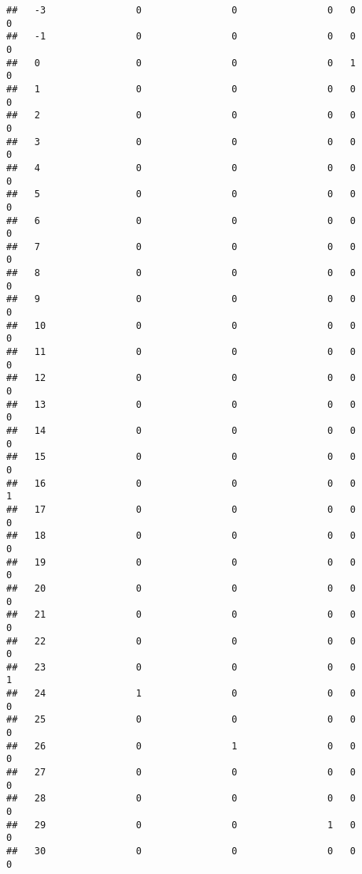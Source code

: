 \documentclass[]{article}
\begin{document}
\begin{verbatim}
##   -3                0                0                0   0                0
##   -1                0                0                0   0                0
##   0                 0                0                0   1                0
##   1                 0                0                0   0                0
##   2                 0                0                0   0                0
##   3                 0                0                0   0                0
##   4                 0                0                0   0                0
##   5                 0                0                0   0                0
##   6                 0                0                0   0                0
##   7                 0                0                0   0                0
##   8                 0                0                0   0                0
##   9                 0                0                0   0                0
##   10                0                0                0   0                0
##   11                0                0                0   0                0
##   12                0                0                0   0                0
##   13                0                0                0   0                0
##   14                0                0                0   0                0
##   15                0                0                0   0                0
##   16                0                0                0   0                1
##   17                0                0                0   0                0
##   18                0                0                0   0                0
##   19                0                0                0   0                0
##   20                0                0                0   0                0
##   21                0                0                0   0                0
##   22                0                0                0   0                0
##   23                0                0                0   0                1
##   24                1                0                0   0                0
##   25                0                0                0   0                0
##   26                0                1                0   0                0
##   27                0                0                0   0                0
##   28                0                0                0   0                0
##   29                0                0                1   0                0
##   30                0                0                0   0                0

\end{verbatim}
\end{document}

